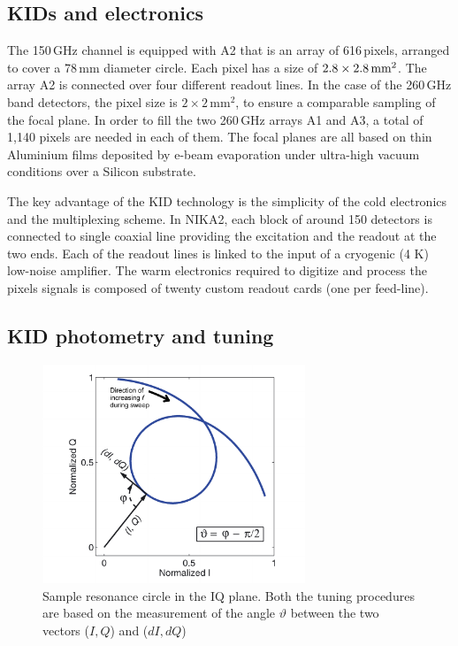 \subsection{KIDs and electronics}
\label{se:array}

The 150\,GHz channel is equipped with A2 that is an array of
616\,pixels, arranged to cover a 78\,mm diameter circle. Each pixel has a size of
$2.8\times2.8\textrm{\,mm}^2$. The array A2 is connected over four different
readout lines. In the case of the 260\,GHz band detectors, the pixel size is
$2\times 2\mathrm{\,mm}^2$, to ensure a comparable sampling of the focal
plane. In order to fill the two 260\,GHz arrays A1 and A3, a total of 1,140 pixels are
needed in each of them. The focal planes are all based on thin Aluminium films
deposited by e-beam evaporation under ultra-high vacuum conditions over a
Silicon substrate.

The key advantage of the KID technology is the simplicity of the cold
electronics and the multiplexing scheme. In NIKA2, each block of around 150
detectors is connected to single coaxial line providing the excitation and the
readout at the two ends. Each of the readout lines is linked to the input of a
cryogenic (4 K) low-noise amplifier. The warm electronics required to digitize
and process the pixels signals is composed of twenty custom readout cards (one
per feed-line).



\subsection{KID photometry and tuning}

\begin{figure}[!b]
\begin{center}
\includegraphics[width = 0.7\textwidth]{Figures/resoCircle-eps-converted-to.pdf}
\caption[KID resonance circle]{Sample resonance circle in the IQ plane. Both the
  tuning procedures are based on the measurement of the angle $\vartheta$
  between the two vectors ($I, Q$) and ($dI, dQ$)}
\label{figResoCircle}
\end{center}
\end{figure}

